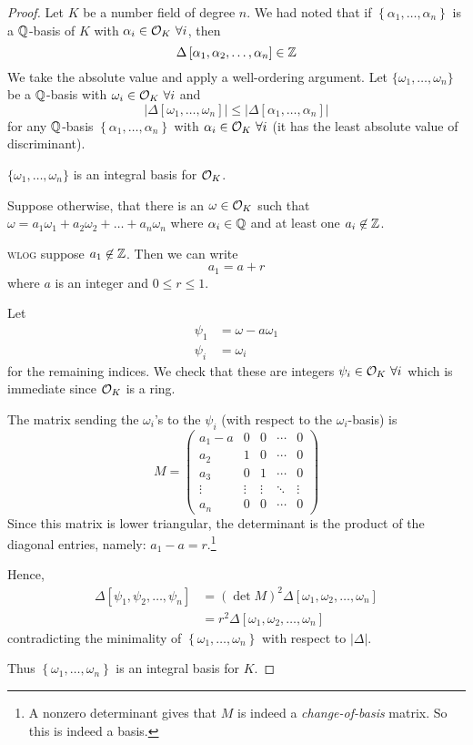 \begin{proof}
    Let $K$ be a number field of degree $n$. We had noted that if $\left\{ \alpha_1, \dots, \alpha_n \right\}$ is a $\mathbb Q$-basis of $K$ with $\alpha_i\in \mathcal{O}_K\ \forall i$, then
    \[\Delta\left[ \alpha_1, \alpha_2, \dots, \alpha_n \right]\in\mathbb Z\]
    We take the absolute value and apply a well-ordering argument. Let $\{\omega_1, \dots, \omega_n\}$ be a $\mathbb Q$-basis with $\omega_i\in\mathcal{O}_K\ \forall i$ and
    \[|\Delta\left[ \omega_1, \dots, \omega_n \right]|\leq |\Delta\left[ \alpha_1, \dots, \alpha_n \right]|\]
    for any $\mathbb Q$-basis $\left\{ \alpha_1, \dots, \alpha_n \right\}$ with $\alpha_i\in \mathcal{O}_K\ \forall i$ (it has the least absolute value of discriminant).

    \begin{claim*}
        $\{\omega_1, \dots, \omega_n\}$ is an integral basis for $\mathcal{O}_K$.
    \end{claim*}
    Suppose otherwise, that there is an $\omega\in\mathcal{O}_K$ such that $\omega = a_1\omega_1 + a_2\omega_2 + \dots + a_n\omega_n$ where $\alpha_i\in\mathbb Q$ and at least one $a_i\not\in\mathbb Z$.

    \textsc{wlog} suppose $a_1\not\in\mathbb Z$. Then we can write
    \[a_1 = a + r\]
    where $a$ is an integer and $0\leq r\leq 1$.

    Let
    \begin{align*}
        \psi_1 & = \omega - a\omega_1 \\
        \psi_i & = \omega_i
    \end{align*}
    for the remaining indices. We check that these are integers $\psi_i\in\mathcal{O}_K\ \forall i$ which is immediate since $\mathcal{O}_K$ is a ring.

    The matrix sending the $\omega_i$'s to the $\psi_i$ (with respect to the $\omega_i$-basis) is
    \[M = \begin{pmatrix}
            a_1 - a & 0      & 0      & \cdots & 0      \\
            a_2     & 1      & 0      & \cdots & 0      \\
            a_3     & 0      & 1      & \cdots & 0      \\
            \vdots  & \vdots & \vdots & \ddots & \vdots \\
            a_n     & 0      & 0      & \cdots & 0
        \end{pmatrix}\]
    Since this matrix is lower triangular, the determinant is the product of the diagonal entries, namely: $a_1 - a = r$.\footnote{A nonzero determinant gives that $M$ is indeed a \emph{change-of-basis} matrix. So this is indeed a basis.}

    Hence,
    \begin{align*}
        \Delta[\psi_1, \psi_2, \dots, \psi_n] & = (\det M)^2\Delta[\omega_1, \omega_2, \dots, \omega_n] \\
                                              & = r^2\Delta[\omega_1, \omega_2, \dots, \omega_n]
    \end{align*}
    contradicting the minimality of $\left\{ \omega_1, \dots, \omega_n \right\}$ with respect to $|\Delta|$.

    Thus $\left\{ \omega_1, \dots, \omega_n \right\}$ is an integral basis for $K$.
\end{proof}

